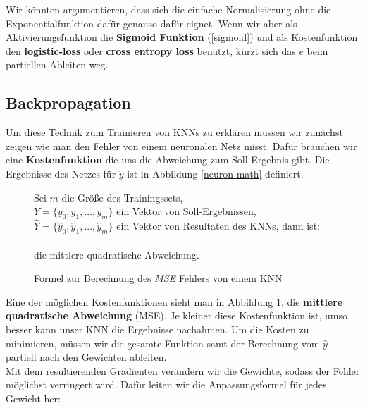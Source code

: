             \noindent
            Wir könnten argumentieren, dass sich die einfache Normalisierung ohne die Exponentialfunktion dafür genauso dafür eignet. Wenn wir aber als Aktivierungsfunktion die \textbf{Sigmoid Funktion} (\ref{sigmoid}) und als Kostenfunktion den \textbf{logistic-loss} oder \textbf{cross entropy loss} benutzt, kürzt sich das $e$ beim partiellen Ableiten weg.


            \subsection{Backpropagation} \label{backprop-chapter}
                Um diese Technik zum Trainieren von KNNs zu erklären müssen wir zunächst zeigen wie man den Fehler von einem neuronalen Netz misst. Dafür brauchen wir eine \textbf{Kostenfunktion} die uns die Abweichung zum Soll-Ergebnis gibt. Die Ergebnisse des Netzes für $\widehat{y}$ ist in Abbildung \ref{neuron-math} definiert.



                \begin{figure}[H]
                    \begin{mdframed}
                        \noindent
                        Sei $m$ die Größe des Trainingssets,\\
                        \hspace*{4.5mm} $Y = \{y_0, y_1,...,y_m\}$ ein Vektor von Soll-Ergebnissen, \\
                        \hspace*{4.5mm} $\widehat{Y} = \{\widehat{y}_0, \widehat{y}_1,...,\widehat{y}_m\}$ ein Vektor von Resultaten des KNNs, dann ist:\\[4mm]
                        \hspace*{30mm} \\[4mm]
                        die mittlere quadratische Abweichung.
                    \end{mdframed}
                    \caption{\label{cost-math} Formel zur Berechnung des \textit{MSE} Fehlers von einem KNN}
                \end{figure}
                \noindent
                Eine der möglichen Kostenfunktionen sieht man in Abbildung \ref{cost-math}, die \textbf{mittlere quadratische Abweichung} (MSE). Je kleiner diese Kostenfunktion ist, umso besser kann unser KNN die Ergebnisse nachahmen. Um die Kosten zu minimieren, müssen wir die gesamte Funktion samt der Berechnung vom $\widehat{y}$ partiell nach den Gewichten ableiten. \\[2mm]
                Mit dem resultierenden Gradienten verändern wir die Gewichte, sodass der Fehler möglichst verringert wird. Dafür leiten wir die Anpassungsformel für jedes Gewicht her:

